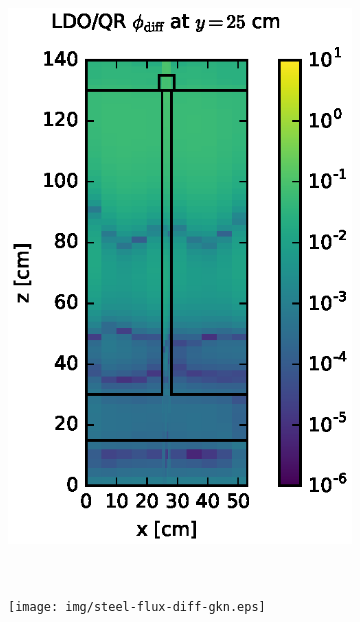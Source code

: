 \documentclass{article} %
\begin{document}
\begin{figure}[!htb]
\centering
\begin{subfigure}{0.4\textwidth}
\includegraphics[max height=0.445\textheight]
{img/steel-flux-diff-qr.eps}
\end{subfigure} ~
\begin{subfigure}{0.4\textwidth}
\texttt{[image: img/steel-flux-diff-gkn.eps]}
\end{subfigure}
\\
\begin{subfigure}{0.4\textwidth}

\end{subfigure}
\end{figure}
\end{document}
